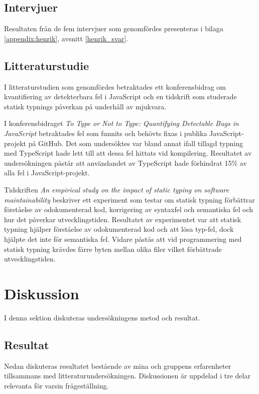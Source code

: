 \subsection{Intervjuer}
Resultaten från de fem intervjuer som genomfördes presenteras i bilaga \ref{appendix:henrik}, avsnitt \ref{henrik_svar}.
\subsection{Litteraturstudie}
I litteraturstudien som genomfördes betraktades ett konferensbidrag om kvantifiering av detekterbara fel i JavaScript och en tidskrift som studerade statisk typnings påverkan på underhåll av mjukvara.

I konferensbidraget \textit{To Type or Not to Type:
Quantifying Detectable Bugs in JavaScript} \cite{henrik_totypeornot} betraktades fel som funnits och behövts fixas i publika JavaScript-projekt på GitHub. Det som undersöktes var bland annat ifall tillagd typning med TypeScript hade lett till att dessa fel hittats vid kompilering.
Resultatet av undersökningen påstår att användandet av TypeScript hade förhindrat 15\% av alla fel i JavaScript-projekt.

Tidskriften \textit{An empirical study on the impact of static typing
on software maintainability} \cite{henrik_maintainability} beskriver ett experiment som testar om statisk typning förbättrar förståelse av odokumenterad kod, korrigering av syntaxfel och semantiska fel och hur det påverkar utvecklingstiden.
Resultatet av experimentet var att statisk typning hjälper förståelse av odokumenterad kod och att lösa typ-fel, dock hjälpte det inte för semantiska fel. Vidare påstås att vid programmering med statisk typning krävdes färre byten mellan olika filer vilket förbättrade utvecklingstiden.

\section{Diskussion}
I denna sektion diskuteras undersökningens metod och resultat.
\subsection{Resultat}
Nedan diskuteras resultatet bestående av mina och gruppens erfarenheter tillsammans med litteraturundersökningen. Diskussionen är uppdelad i tre delar relevanta för varsin frågeställning.
